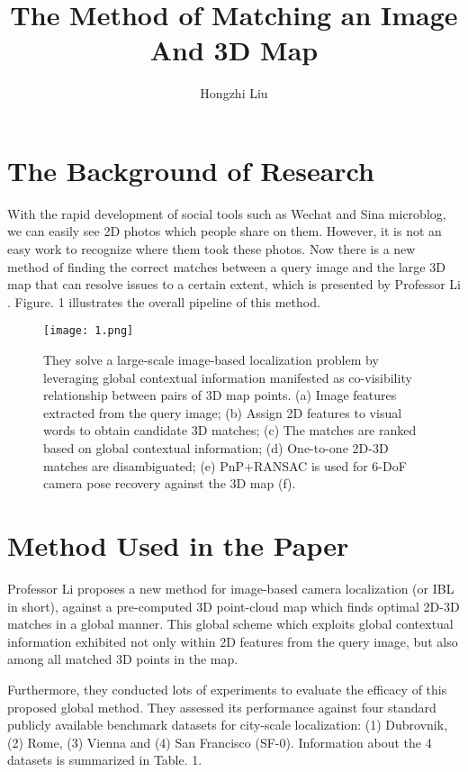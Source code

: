 \documentclass{article}
\author{Hongzhi Liu}
\title{The Method of Matching an Image And 3D Map}
\begin{document}
	\maketitle
	\par
	\section{The Background of Research}
    With the rapid development of social tools such as Wechat and Sina microblog, we can easily see 2D photos which people share on them. However, it is not an easy work to recognize where them took these photos. Now there is a new method of finding the correct matches between a query image and the large 3D map that can resolve issues to a certain extent, which is presented by Professor Li \cite{Liu2017Efficient}. Figure. 1 illustrates the overall pipeline of this method.
	
	\begin{figure}[ht]
		\centering
		\texttt{[image: 1.png]}
		\caption{They solve a large-scale image-based localization problem by leveraging global contextual information manifested as co-visibility relationship between pairs of 3D map points. (a) Image features extracted from the query image; (b) Assign 2D features to visual words to obtain candidate 3D matches; (c) The matches are ranked based on global contextual information; (d) One-to-one 2D-3D matches are disambiguated; (e) PnP+RANSAC is used for 6-DoF camera pose recovery against the 3D map (f).}
	\end{figure}

	
	\section{Method Used in the Paper}
	
    Professor Li proposes a new method for image-based camera localization (or IBL in short), against a pre-computed 3D point-cloud map which finds optimal 2D-3D matches in a global manner. This global scheme which exploits global contextual information exhibited not only within 2D features from the query image, but also among all matched 3D points in the map.
    
    Furthermore, they conducted lots of experiments to evaluate the efficacy of this proposed global method. They assessed its performance against four standard publicly available benchmark datasets for city-scale localization: (1) Dubrovnik, (2) Rome, (3) Vienna and (4) San Francisco (SF-0). Information about the 4 datasets is summarized in Table. 1.
\end{document}
